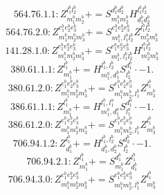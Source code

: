 \documentclass[letterpaper,10pt,fleqn,leqno,onecolumn]{article}
\begin{document}
\begin{equation} \;\;\;\;\;\;  564.76.1.1: Z^{l_{1}^{b}l_{2}^{b}}_{m_{1}^{b}m_{2}^{b}}+=S^{d_{1}^{b}d_{2}^{b}}_{m_{1}^{b}m_{2}^{b}}H^{l_{1}^{b}l_{2}^{b}}_{d_{1}^{b}d_{2}^{b}} \end{equation}
\begin{equation} \;\;\;\;\;\;  564.76.2.0: Z^{e_{1}^{b}e_{2}^{b}e_{3}^{b}}_{m_{1}^{b}m_{2}^{b}m_{3}^{b}}+=S^{e_{1}^{b}e_{2}^{b}e_{3}^{b}}_{m_{1}^{b},l_{1}^{b}l_{2}^{b}}Z^{l_{1}^{b}l_{2}^{b}}_{m_{2}^{b}m_{3}^{b}} \end{equation}
\begin{equation} \;\;\;\;\;\;  141.28.1.0: Z^{e_{1}^{b}e_{2}^{b}e_{3}^{b}}_{m_{1}^{b}m_{2}^{b}m_{3}^{b}}+=S^{e_{1}^{b}e_{2}^{b}e_{3}^{b}}_{m_{1}^{b},l_{1}^{b}l_{2}^{b}}H^{l_{1}^{b}l_{2}^{b}}_{m_{2}^{b}m_{3}^{b}} \end{equation}
\begin{equation} \;\;\;\;\;\;  380.61.1.1: Z^{l_{1}^{b}}_{m_{1}^{b}}+=H^{l_{1}^{b},l_{2}^{b}}_{m_{1}^{b},d_{1}^{b}}S^{d_{1}^{b}}_{l_{2}^{b}}\cdot -1. \end{equation}
\begin{equation} \;\;\;\;\;\;  380.61.2.0: Z^{e_{1}^{b}e_{2}^{b}e_{3}^{b}}_{m_{1}^{b}m_{2}^{b}m_{3}^{b}}+=S^{e_{1}^{b}e_{2}^{b}e_{3}^{b}}_{m_{1}^{b}m_{2}^{b},l_{1}^{b}}Z^{l_{1}^{b}}_{m_{3}^{b}} \end{equation}
\begin{equation} \;\;\;\;\;\;  386.61.1.1: Z^{l_{1}^{b}}_{m_{1}^{b}}+=H^{l_{1}^{b},l_{1}^{a}}_{m_{1}^{b},d_{1}^{a}}S^{d_{1}^{a}}_{l_{1}^{a}}\cdot -1. \end{equation}
\begin{equation} \;\;\;\;\;\;  386.61.2.0: Z^{e_{1}^{b}e_{2}^{b}e_{3}^{b}}_{m_{1}^{b}m_{2}^{b}m_{3}^{b}}+=S^{e_{1}^{b}e_{2}^{b}e_{3}^{b}}_{m_{1}^{b}m_{2}^{b},l_{1}^{b}}Z^{l_{1}^{b}}_{m_{3}^{b}} \end{equation}
\begin{equation} \;\;\;\;\;\;  706.94.1.2: Z^{l_{1}^{b}}_{d_{1}^{b}}+=H^{l_{1}^{b},l_{2}^{b}}_{d_{1}^{b},d_{2}^{b}}S^{d_{2}^{b}}_{l_{2}^{b}}\cdot -1. \end{equation}
\begin{equation} \;\;\;\;\;\;  706.94.2.1: Z^{l_{1}^{b}}_{m_{1}^{b}}+=S^{d_{1}^{b}}_{m_{1}^{b}}Z^{l_{1}^{b}}_{d_{1}^{b}} \end{equation}
\begin{equation} \;\;\;\;\;\;  706.94.3.0: Z^{e_{1}^{b}e_{2}^{b}e_{3}^{b}}_{m_{1}^{b}m_{2}^{b}m_{3}^{b}}+=S^{e_{1}^{b}e_{2}^{b}e_{3}^{b}}_{m_{1}^{b}m_{2}^{b},l_{1}^{b}}Z^{l_{1}^{b}}_{m_{3}^{b}} \end{equation}
\end{document}
